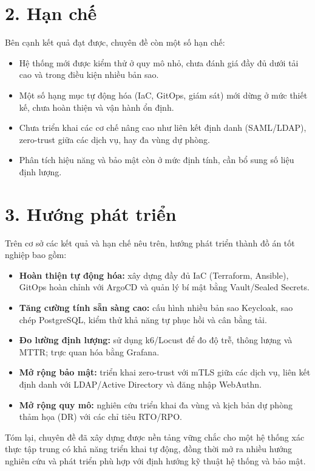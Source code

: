 \section*{2. Hạn chế}

Bên cạnh kết quả đạt được, chuyên đề còn một số hạn chế:

\begin{itemize}
  \item Hệ thống mới được kiểm thử ở quy mô nhỏ, chưa đánh giá đầy đủ dưới tải
  cao và trong điều kiện nhiều bản sao.
  \item Một số hạng mục tự động hóa (IaC, GitOps, giám sát) mới dừng ở mức
  thiết kế, chưa hoàn thiện và vận hành ổn định.
  \item Chưa triển khai các cơ chế nâng cao như liên kết định danh (SAML/LDAP),
  zero-trust giữa các dịch vụ, hay đa vùng dự phòng.
  \item Phân tích hiệu năng và bảo mật còn ở mức định tính, cần bổ sung số liệu
  định lượng.
\end{itemize}

\section*{3. Hướng phát triển}

Trên cơ sở các kết quả và hạn chế nêu trên, hướng phát triển thành đồ án tốt
nghiệp bao gồm:

\begin{itemize}
  \item \textbf{Hoàn thiện tự động hóa:} xây dựng đầy đủ IaC (Terraform,
  Ansible), GitOps hoàn chỉnh với ArgoCD và quản lý bí mật bằng Vault/Sealed
  Secrets.
  \item \textbf{Tăng cường tính sẵn sàng cao:} cấu hình nhiều bản sao Keycloak,
  sao chép PostgreSQL, kiểm thử khả năng tự phục hồi và cân bằng tải.
  \item \textbf{Đo lường định lượng:} sử dụng k6/Locust để đo độ trễ, thông
  lượng và MTTR; trực quan hóa bằng Grafana.
  \item \textbf{Mở rộng bảo mật:} triển khai zero-trust với mTLS giữa các dịch
  vụ, liên kết định danh với LDAP/Active Directory và đăng nhập WebAuthn.
  \item \textbf{Mở rộng quy mô:} nghiên cứu triển khai đa vùng và kịch bản dự
  phòng thảm họa (DR) với các chỉ tiêu RTO/RPO.
\end{itemize}

\vspace{0.5cm}
Tóm lại, chuyên đề đã xây dựng được nền tảng vững chắc cho một hệ thống xác
thực tập trung có khả năng triển khai tự động, đồng thời mở ra nhiều hướng
nghiên cứu và phát triển phù hợp với định hướng kỹ thuật hệ thống và bảo mật.
